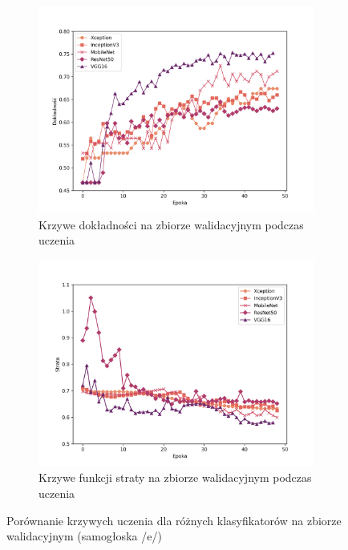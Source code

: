 \begin{figure}[ht]
    \centering
    \begin{subfigure}{0.49\textwidth}
        \centering
        \includegraphics[width=\textwidth]{./img/results/e_acc}
        \caption{Krzywe dokładności na zbiorze walidacyjnym podczas uczenia\@}
        \label{fig:e_acc}
    \end{subfigure}
    \begin{subfigure}{0.49\textwidth}
        \centering
        \includegraphics[width=\textwidth]{./img/results/e_loss}
        \caption{Krzywe funkcji straty na zbiorze walidacyjnym podczas uczenia\@}
        \label{fig:e_loss}
    \end{subfigure}

    \caption{Porównanie krzywych uczenia dla różnych klasyfikatorów na zbiorze walidacyjnym (samogłoska /e/)}
    \label{fig:e_results}
\end{figure}

